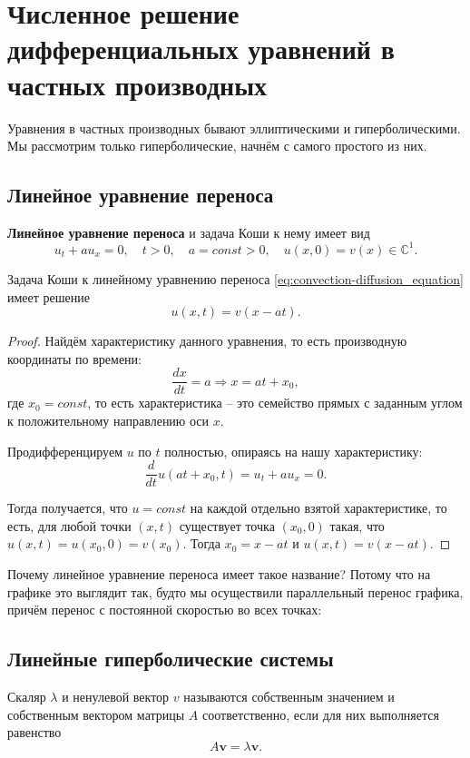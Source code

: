 \documentclass{article}
\begin{document}
\section{Численное решение дифференциальных уравнений в частных производных}

Уравнения в частных производных бывают эллиптическими и гиперболическими. Мы
рассмотрим только гиперболические, начнём с самого простого из них.

\subsection{Линейное уравнение переноса}
\begin{define}\label{eq:convection-diffusion_equation}
	\textbf{Линейное уравнение переноса} и задача Коши к нему имеет вид
	\[u_t+au_x=0,\quad t>0,\quad a=const>0,\quad u(x,0)=v(x)\in
	\mathbb C^1.\]
\end{define}

\begin{lemma}\label{eq:CDE_solution}
	Задача Коши к линейному уравнению переноса
	\eqref{eq:convection-diffusion_equation} имеет решение
	\[\boxed{u(x,t)=v(x-at)}.\]
\end{lemma}

\begin{proof}
	Найдём характеристику данного уравнения, то есть производную
	координаты по времени:
	\[\frac{dx}{dt}=a\Rightarrow x=at+x_0,\]
	где $x_0=const$, то есть характеристика -- это семейство прямых с
	заданным углом к положительному направлению оси $x$.

	Продифференцируем $u$ по $t$ полностью, опираясь на нашу характеристику:
	\[\frac{d}{dt}u(at+x_0,t)=u_t+au_x=0.\]

	Тогда получается, что $u=const$ на каждой отдельно взятой
	характеристике, то есть, для любой точки $(x,t)$ существует точка
	$(x_0,0)$ такая, что $u(x,t)=u(x_0,0)=v(x_0)$. Тогда $x_0=x-at$ и
	$u(x,t)=v(x-at)$.
\end{proof}

Почему линейное уравнение переноса имеет такое название? Потому что на графике
это выглядит так, будто мы осуществили параллельный перенос графика, причём
перенос с постоянной скоростью во всех точках: \\



\subsection{Линейные гиперболические системы}
\begin{define}
	Скаляр $\lambda$ и ненулевой вектор $v$ называются собственным
	значением и собственным вектором матрицы $A$ соответственно, если для
	них выполняется равенство
	\[A\boldsymbol v=\lambda \boldsymbol v.\]
\end{define}
\end{document}

